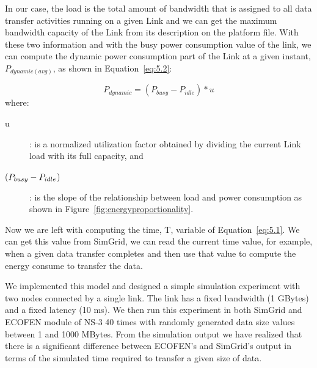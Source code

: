 In our case, the load is the total amount of bandwidth that is assigned to all data transfer activities running on a given Link and we can get the maximum bandwidth capacity of the Link from its description on the platform file. With these two information and with the busy power consumption value of the link, we can compute the dynamic power consumption part of the Link at a given instant, \(P_{dynamic (avg)}\), as shown in Equation~\ref{eq:5.2}:

\begin{equation} \label{eq:5.2}
P_{dynamic} = (P_{busy} - P_{idle}) * u 
\end{equation} 
where:
\begin{description}
    \item [u]: is a normalized utilization factor obtained by dividing the current Link load with its full capacity, and 
    \item [(\($$P_{busy} - P_{idle}$$\))]: is the slope of the relationship between load and power consumption as shown in Figure~\ref{fig:energyproportionality}.
\end{description} 

Now we are left with computing the time, T, variable of Equation~\ref{eq:5.1}. We can get this value from SimGrid, we can read the current time value, for example, when a given data transfer completes and then use that value to compute the energy consume to transfer the data.

We implemented this model and designed a simple simulation experiment with two nodes connected by a single link. The link has a fixed bandwidth (1 GBytes) and a fixed latency (10 ms). We then run this experiment in both SimGrid and ECOFEN module of NS-3 40 times with randomly generated data size values between 1 and 1000 MBytes. From the simulation output we have realized that there is a significant difference between ECOFEN's and SimGrid's output in terms of the simulated time required to transfer a given size of data. 

